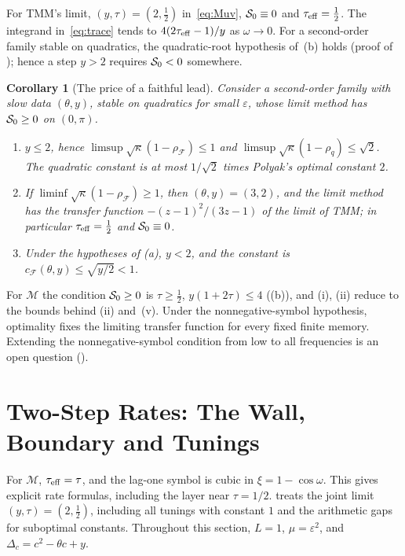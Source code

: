 \documentclass[11pt]{article}
\newtheorem{corollary}[theorem]{Corollary}
\theoremstyle{definition}
\theoremstyle{remark}
\newcommand{\cF}{\mathcal F}
\newcommand{\cM}{\mathcal M}
\newcommand{\rhoF}{\rho_{\cF}}
\newcommand{\cFF}{c_{\cF}}
\newcommand{\teff}{\tau_{\rm eff}}
\begin{document}
For TMM's limit, \((y,\tau)=(2,\frac12)\) in~\eqref{eq:Muv},
\(\mathcal S_0\equiv0\) and \(\teff=\frac12\).
The integrand in~\eqref{eq:trace} tends to \(4(2\teff-1)/y\) as \(\omega\to0\).
For a second-order family stable on quadratics, the quadratic-root hypothesis of~(b) holds
(proof of ); hence a step \(y>2\) requires \(\mathcal S_0<0\) somewhere.
\begin{corollary}[The price of a faithful lead]\label{cor:yle2}
Consider a second-order family with slow data \((\theta,y)\), stable on quadratics for small \(\varepsilon\), whose
limit method has \(\mathcal S_0\ge0\) on \((0,\pi)\).
\begin{enumerate}[label=\textup{(\roman*)}]
\item \(y\le2\), hence \(\limsup\sqrt\kappa(1-\rhoF)\le1\) and
\(\limsup\sqrt\kappa(1-\rho_q)\le\sqrt2\).  The quadratic constant is at
most \(1/\sqrt2\) times Polyak's optimal constant \(2\).
\item If \(\liminf\sqrt\kappa(1-\rhoF)\ge1\), then \((\theta,y)=(3,2)\), and the limit method has the transfer
function \(-(z-1)^2/(3z-1)\) of the limit of TMM; in particular \(\teff=\frac12\) and \(\mathcal S_0\equiv0\).
\item Under the hypotheses of (a), \(y<2\), and the constant is \(\cFF(\theta,y)\le\sqrt{y/2}<1\).
\end{enumerate}
\end{corollary}

For \(\cM\) the condition \(\mathcal S_0\ge0\) is \(\tau\ge\frac12\), \(y(1+2\tau)\le4\) ((b)), and (i), (ii) reduce to the
bounds behind (ii) and~(v).  Under the nonnegative-symbol hypothesis,
optimality fixes the limiting transfer function for every fixed finite memory.
Extending the nonnegative-symbol condition from low to all frequencies is an open
question ().
%
\section{Two-Step Rates: The Wall, Boundary and Tunings}
\label{sec:constant}
%

For \(\cM\), \(\teff=\tau\), and the lag-one symbol is cubic in
\(\xi=1-\cos\omega\).  This gives explicit rate formulas, including the layer near
\(\tau=1/2\).
 treats the joint limit \((y,\tau)=(2,\tfrac12)\), including all tunings with
constant \(1\) and the arithmetic gaps for suboptimal constants.
Throughout this section, \(L=1\), \(\mu=\varepsilon^2\), and \(\Delta_c=c^2-\theta c+y\).
\end{document}
